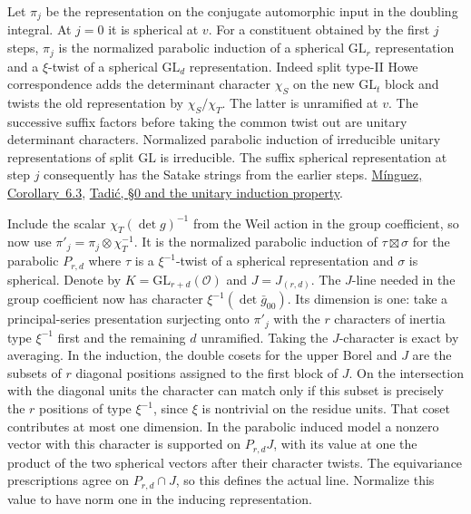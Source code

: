 Let \(\pi_j\) be the representation on the conjugate
automorphic input in the doubling integral. At \(j=0\)
it is spherical at \(v\). For a constituent obtained by
the first \(j\) steps, \(\pi_j\) is the normalized
parabolic induction of a spherical \(\mathrm{GL}_r\)
representation and a \(\xi\)-twist of a spherical
\(\mathrm{GL}_d\) representation. Indeed split type-II
Howe correspondence adds the determinant character
\(\chi_S\) on the new \(\mathrm{GL}_t\) block and
twists the old representation by \(\chi_S/\chi_T\).
The latter is unramified at \(v\). The successive
suffix factors before taking the common twist out are
unitary determinant characters. Normalized parabolic
induction of irreducible unitary representations of
split \(\mathrm{GL}\) is irreducible. The suffix
spherical representation at step \(j\) consequently
has the Satake strings from the earlier steps.
\href{https://www.numdam.org/item/ASENS_2008_4_41_5_717_0/}{M\'inguez, Corollary~6.3},
\href{https://www.numdam.org/articles/10.24033/asens.1510/}{Tadi\'c, \S0 and the unitary induction property}.

Include the scalar \(\chi_T(\det g)^{-1}\) from the Weil
action in the group coefficient, so now use
\(\pi'_j=\pi_j\otimes\chi_T^{-1}\). It is the
normalized parabolic induction of
\(\tau\boxtimes\sigma\) for the parabolic \(P_{r,d}\)
where \(\tau\) is a \(\xi^{-1}\)-twist of a spherical
representation and \(\sigma\) is spherical. Denote
by \(K=\mathrm{GL}_{r+d}(\mathcal O)\) and
\(J=J_{(r,d)}\). The \(J\)-line needed in the group
coefficient now has character
\(\xi^{-1}(\det\bar g_{00})\). Its dimension is one:
take a principal-series presentation surjecting onto
\(\pi'_j\) with the \(r\) characters of inertia type
\(\xi^{-1}\) first and the remaining \(d\) unramified.
Taking the \(J\)-character is exact by averaging.
In the induction, the double cosets for the upper
Borel and \(J\) are the subsets of \(r\) diagonal
positions assigned to the first block of \(J\).
On the intersection with the diagonal units the
character can match only if this subset is precisely
the \(r\) positions of type \(\xi^{-1}\), since
\(\xi\) is nontrivial on the residue units. That coset
contributes at most one dimension. In the parabolic
induced model a nonzero vector with this character
is supported on \(P_{r,d}J\), with its value at one
the product of the two spherical vectors after
their character twists. The equivariance prescriptions
agree on \(P_{r,d}\cap J\), so this defines the
actual line. Normalize this value to have norm one
in the inducing representation.

